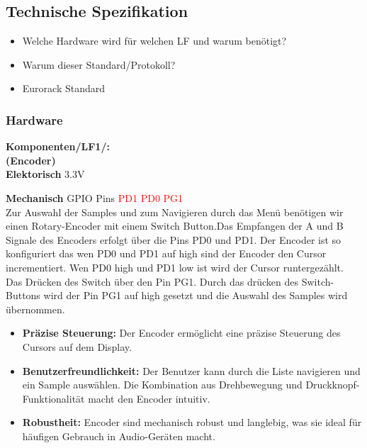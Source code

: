 \newpage
\subsection{Technische Spezifikation}
\begin{itemize}
    \item Welche Hardware wird für welchen LF und warum benötigt?
    \item Warum dieser Standard/Protokoll?
    \item Eurorack Standard
\end{itemize}


\subsubsection{Hardware}

\textbf{Komponenten/LF1/:} \\


\textbf{(Encoder)} \\

\textbf{Elektorisch} 3.3V

\textbf{Mechanisch} GPIO Pins \textcolor{red}{PD1 PD0 PG1}
 \\

Zur Auswahl der Samples und zum Navigieren durch das Menü benötigen wir einen Rotary-Encoder mit einem Switch Button.Das Empfangen der A und B Signale des Encoders erfolgt über die Pins PD0 und PD1. Der Encoder ist so konfiguriert das wen PD0 und PD1 auf high sind der Encoder den Cursor incrementiert. Wen PD0 high und PD1 low ist wird der Cursor runtergezählt.
Das Drücken des Switch über den Pin PG1. Durch das drücken des Switch-Buttons wird der Pin PG1 auf high gesetzt und die Auswahl des Samples wird übernommen.

\begin{itemize}
    \item \textbf{Präzise Steuerung:} Der Encoder ermöglicht eine präzise Steuerung des Cursors auf dem Display.
    
    \item \textbf{Benutzerfreundlichkeit:} Der Benutzer kann durch die Liste navigieren und ein Sample auswählen. Die Kombination aus Drehbewegung und Druckknopf-Funktionalität macht den Encoder intuitiv.
    
    \item \textbf{Robustheit:} Encoder sind mechanisch robust und langlebig, was sie ideal für häufigen Gebrauch in Audio-Geräten macht.
\end{itemize}





